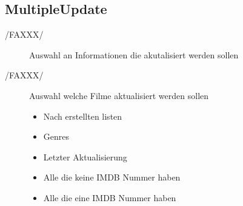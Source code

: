 \subsection{MultipleUpdate}
\begin{description}
	\item[/FAXXX/] Auswahl an Informationen die akutalisiert werden sollen
	\item[/FAXXX/] Auswahl welche Filme aktualisiert werden sollen
	\begin{itemize}
		\item Nach erstellten listen
		\item Genres
		\item Letzter Aktualisierung
		\item Alle die keine IMDB Nummer haben
		\item Alle die eine IMDB Nummer haben
	\end{itemize}
\end{description}
		

